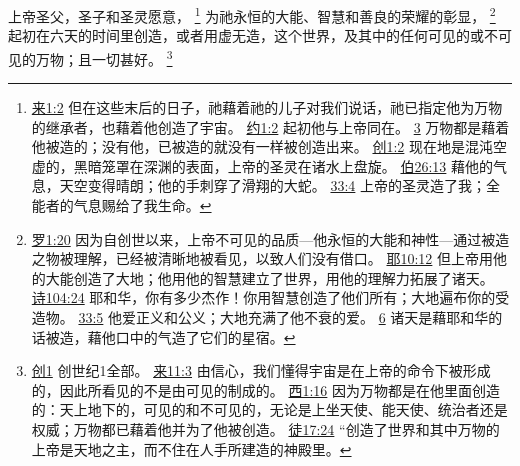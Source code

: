 \documentclass[12pt, a4paper, oneside]{ctexart}
\newcounter{parnum}[section]
\newcommand{\N}{%
   \noindent\refstepcounter{parnum}%
    \makebox[\parindent][l]{\textbf{\arabic{parnum}.}}}
\begin{document}
\N 上帝圣父，圣子和圣灵愿意，
	\footnote {
		\href{https://biblehub.com/hebrews/1-2.htm}{来1:2} 但在这些末后的日子，祂藉着祂的儿子对我们说话，祂已指定他为万物的继承者，也藉着他创造了宇宙。 
		\href{https://biblehub.com/john/1-2.htm}{约1:2} 起初他与上帝同在。
		\href{https://biblehub.com/john/1-3.htm}{3} 万物都是藉着他被造的；没有他，已被造的就没有一样被创造出来。
		\href{https://biblehub.com/genesis/1-2.htm}{创1:2} 现在地是混沌空虚的，黑暗笼罩在深渊的表面，上帝的圣灵在诸水上盘旋。
		\href{https://biblehub.com/job/26-13.htm}{伯26:13} 藉他的气息，天空变得晴朗；他的手刺穿了滑翔的大蛇。
		\href{https://biblehub.com/job/33-4.htm}{33:4} 上帝的圣灵造了我；全能者的气息赐给了我生命。
	}
	为祂永恒的大能、智慧和善良的荣耀的彰显，
	\footnote {
		\href{https://biblehub.com/romans/1-20.htm}{罗1:20} 因为自创世以来，上帝不可见的品质---他永恒的大能和神性---通过被造之物被理解，已经被清晰地被看见，以致人们没有借口。
		\href{https://biblehub.com/jeremiah/10-12.htm}{耶10:12} 但上帝用他的大能创造了大地；他用他的智慧建立了世界，用他的理解力拓展了诸天。
		\href{https://biblehub.com/psalms/104-24.htm}{诗104:24} 耶和华，你有多少杰作！你用智慧创造了他们所有；大地遍布你的受造物。
		\href{https://biblehub.com/psalms/33-5.htm}{33:5} 他爱正义和公义；大地充满了他不衰的爱。
		\href{https://biblehub.com/psalms/33-6.htm}{6} 诸天是藉耶和华的话被造，藉他口中的气造了它们的星宿。
	}
	起初在六天的时间里创造，或者用虚无造，这个世界，及其中的任何可见的或不可见的万物；且一切甚好。
	\footnote {
		\href{https://biblehub.com/niv/genesis/1.htm}{创1} 创世纪1全部。
		\href{https://biblehub.com/hebrews/11-3.htm}{来11:3} 由信心，我们懂得宇宙是在上帝的命令下被形成的，因此所看见的不是由可见的制成的。
		\href{https://biblehub.com/colossians/1-16.htm}{西1:16} 因为万物都是在他里面创造的：天上地下的，可见的和不可见的，无论是上坐天使、能天使、统治者还是权威；万物都已藉着他并为了他被创造。
		\href{https://biblehub.com/acts/17-24.htm}{徒17:24} “创造了世界和其中万物的上帝是天地之主，而不住在人手所建造的神殿里。
	}
\end{document}

